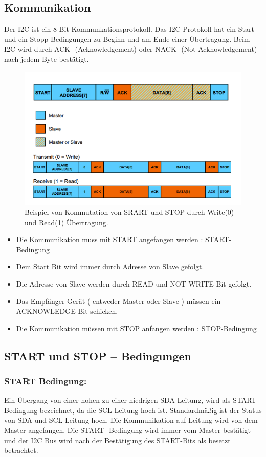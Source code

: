 \documentclass[conference]{IEEEtran}
\begin{document}
\subsection{Kommunikation}

Der I2C ist ein 8-Bit-Kommunkationsprotokoll. Das I2C-Protokoll hat ein Start und ein Stopp Bedingungen zu Beginn und am Ende einer Übertragung. Beim I2C wird durch ACK- (Acknowledgement) oder NACK- (Not Acknowledgement) nach jedem Byte bestätigt.


\begin{figure}[h]
	\centering
	\includegraphics[width=0.7\linewidth]{fig14}
	\caption{Beispiel von Kommutation von SRART und STOP durch Write(0) und Read(1) Übertragung.}
	\label{fig:fig14}
\end{figure}



\begin{itemize}
\item Die Kommunikation muss mit START angefangen werden : START-Bedingung
\item	Dem Start Bit wird immer durch Adresse von Slave gefolgt. 
\item	Die Adresse von Slave werden durch READ und NOT WRITE Bit gefolgt. 
\item Das Empfänger-Gerät ( entweder Master oder Slave ) müssen ein ACKNOWLEDGE Bit schicken.  
\item	Die Kommunikation müssen mit STOP anfangen werden : STOP-Bedingung
	
\end{itemize}

\subsection{	START und STOP – Bedingungen}
\subsubsection{START Bedingung: }
Ein Übergang von einer hohen zu einer niedrigen SDA-Leitung, wird als START-Bedingung bezeichnet, da die SCL-Leitung hoch ist. Standardmäßig ist der Status von SDA und SCL Leitung hoch. Die Kommunikation auf Leitung wird von dem Master angefangen. Die START- Bedingung wird immer vom Master bestätigt und der I2C Bus wird nach der Bestätigung des START-Bits als besetzt betrachtet. 
\end{document}
